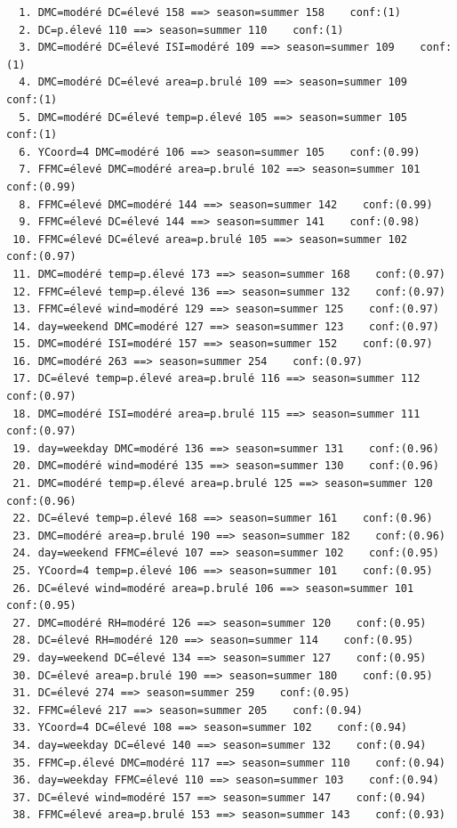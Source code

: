 \documentclass{article}
\begin{document}
\begin{sffamily}
\begin{center}
\begin{verbatim}
  1. DMC=modéré DC=élevé 158 ==> season=summer 158    conf:(1)
  2. DC=p.élevé 110 ==> season=summer 110    conf:(1)
  3. DMC=modéré DC=élevé ISI=modéré 109 ==> season=summer 109    conf:(1)
  4. DMC=modéré DC=élevé area=p.brulé 109 ==> season=summer 109    conf:(1)
  5. DMC=modéré DC=élevé temp=p.élevé 105 ==> season=summer 105    conf:(1)
  6. YCoord=4 DMC=modéré 106 ==> season=summer 105    conf:(0.99)
  7. FFMC=élevé DMC=modéré area=p.brulé 102 ==> season=summer 101    conf:(0.99)
  8. FFMC=élevé DMC=modéré 144 ==> season=summer 142    conf:(0.99)
  9. FFMC=élevé DC=élevé 144 ==> season=summer 141    conf:(0.98)
 10. FFMC=élevé DC=élevé area=p.brulé 105 ==> season=summer 102    conf:(0.97)
 11. DMC=modéré temp=p.élevé 173 ==> season=summer 168    conf:(0.97)
 12. FFMC=élevé temp=p.élevé 136 ==> season=summer 132    conf:(0.97)
 13. FFMC=élevé wind=modéré 129 ==> season=summer 125    conf:(0.97)
 14. day=weekend DMC=modéré 127 ==> season=summer 123    conf:(0.97)
 15. DMC=modéré ISI=modéré 157 ==> season=summer 152    conf:(0.97)
 16. DMC=modéré 263 ==> season=summer 254    conf:(0.97)
 17. DC=élevé temp=p.élevé area=p.brulé 116 ==> season=summer 112    conf:(0.97)
 18. DMC=modéré ISI=modéré area=p.brulé 115 ==> season=summer 111    conf:(0.97)
 19. day=weekday DMC=modéré 136 ==> season=summer 131    conf:(0.96)
 20. DMC=modéré wind=modéré 135 ==> season=summer 130    conf:(0.96)
 21. DMC=modéré temp=p.élevé area=p.brulé 125 ==> season=summer 120    conf:(0.96)
 22. DC=élevé temp=p.élevé 168 ==> season=summer 161    conf:(0.96)
 23. DMC=modéré area=p.brulé 190 ==> season=summer 182    conf:(0.96)
 24. day=weekend FFMC=élevé 107 ==> season=summer 102    conf:(0.95)
 25. YCoord=4 temp=p.élevé 106 ==> season=summer 101    conf:(0.95)
 26. DC=élevé wind=modéré area=p.brulé 106 ==> season=summer 101    conf:(0.95)
 27. DMC=modéré RH=modéré 126 ==> season=summer 120    conf:(0.95)
 28. DC=élevé RH=modéré 120 ==> season=summer 114    conf:(0.95)
 29. day=weekend DC=élevé 134 ==> season=summer 127    conf:(0.95)
 30. DC=élevé area=p.brulé 190 ==> season=summer 180    conf:(0.95)
 31. DC=élevé 274 ==> season=summer 259    conf:(0.95)
 32. FFMC=élevé 217 ==> season=summer 205    conf:(0.94)
 33. YCoord=4 DC=élevé 108 ==> season=summer 102    conf:(0.94)
 34. day=weekday DC=élevé 140 ==> season=summer 132    conf:(0.94)
 35. FFMC=p.élevé DMC=modéré 117 ==> season=summer 110    conf:(0.94)
 36. day=weekday FFMC=élevé 110 ==> season=summer 103    conf:(0.94)
 37. DC=élevé wind=modéré 157 ==> season=summer 147    conf:(0.94)
 38. FFMC=élevé area=p.brulé 153 ==> season=summer 143    conf:(0.93)

\end{verbatim}
\end{center}
\end{sffamily}
\end{document}

